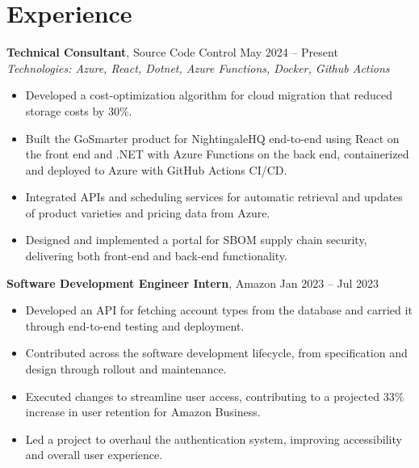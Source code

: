 \documentclass[11pt,a4paper]{article}
\begin{document}
\section{Experience}
\textbf{Technical Consultant}, Source Code Control \hfill May 2024 -- Present
\\ \textit{Technologies: Azure, React, Dotnet, Azure Functions, Docker, Github Actions}
\begin{itemize}
  \item Developed a cost-optimization algorithm for cloud migration that reduced storage costs by 30\%.
  \item Built the GoSmarter product for NightingaleHQ end-to-end using React on the front end and .NET with Azure Functions on the back end, containerized and deployed to Azure with GitHub Actions CI/CD.
  \item Integrated APIs and scheduling services for automatic retrieval and updates of product varieties and pricing data from Azure.
  \item Designed and implemented a portal for SBOM supply chain security, delivering both front-end and back-end functionality.
\end{itemize}
\vspace{2pt}
\textbf{Software Development Engineer Intern}, Amazon \hfill Jan 2023 -- Jul 2023
\begin{itemize}
  \item Developed an API for fetching account types from the database and carried it through end-to-end testing and deployment.
  \item Contributed across the software development lifecycle, from specification and design through rollout and maintenance.
  \item Executed changes to streamline user access, contributing to a projected 33\% increase in user retention for Amazon Business.
  \item Led a project to overhaul the authentication system, improving accessibility and overall user experience.
\end{itemize}
\vspace{2pt}
\end{document}
